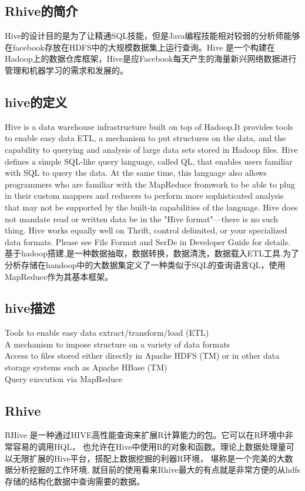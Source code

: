 \documentclass[12pt]{article}
\begin{document}
\begin{CJK*}{UTF8}{gbsn}
\section{Rhive的简介}
Hive的设计目的是为了让精通SQL技能，但是Java编程技能相对较弱的分析师能够在facebook存放在HDFS中的大规模数据集上运行查询。Hive 是一个构建在Hadoop上的数据仓库框架，Hive是应Facebook每天产生的海量新兴网络数据进行管理和机器学习的需求和发展的。\\
\subsection{hive的定义}
\indent Hive is a data warehouse infrastructure built on top of Hadoop.It provides tools to enable easy data ETL, a mechanism to put structures on the data, and the capability to querying and analysis of large data sets stored in Hadoop files. Hive defines a simple SQL-like query language, called QL, that enables users familiar with SQL to query the data. At the same time, this language also allows programmers who are familiar with the MapReduce fromwork to be able to plug in their custom mappers and reducers to perform more sophisticated analysis that may not be supported by the built-in capabilities of the language.
Hive does not mandate read or written data be in the "Hive format"---there is no such thing. Hive works equally well on Thrift, control delimited, or your specialized data formats. Please see File Format and SerDe in Developer Guide for details.\\
\indent 基于hadoop搭建,是一种数据抽取，数据转换，数据清洗，数据载入ETL工具.为了分析存储在handoop中的大数据集定义了一种类似于SQL的查询语言QL，使用MapReduce作为其基本框架。

\subsection{hive描述 }
\* Tools to enable easy data extract/transform/load (ETL) \\
\* A mechanism to impose structure on a variety of data formats \\
\* Access to files stored either directly in Apache HDFS (TM) or in other
  data storage systems such as Apache HBase (TM) \\
\* Query execution via MapReduce
\subsection{Rhive}
RHive 是一种通过HIVE高性能查询来扩展R计算能力的包。它可以在R环境中非常容易的调用HQL， 也允许在Hive中使用R的对象和函数。理论上数据处理量可以无限扩展的Hive平台，搭配上数据挖掘的利器R环境， 堪称是一个完美的大数据分析挖掘的工作环境, 就目前的使用看来Rhive最大的有点就是非常方便的从hdfs存储的结构化数据中查询需要的数据。

\end{CJK*}
\end{document}
